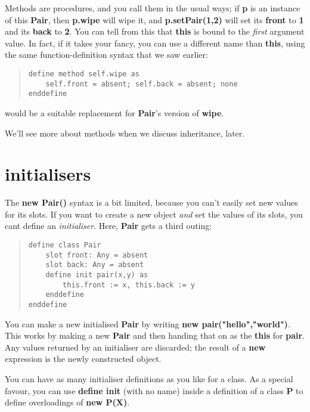\documentclass{report}
\begin{document}
Methods are procedures, and you call them in the usual ways; if {\bf p} is an
instance of this {\bf Pair}, then {\bf p.wipe} will wipe it, and {\bf p.setPair(1,2)} will
set its {\bf front} to {\bf 1} and its {\bf back} to {\bf 2}. You can tell from this that
{\bf this} is bound to the {\em first} argument value. In fact, if it takes your
fancy, you can use a different name than {\bf this}, using the same
function-definition syntax that we saw earlier:

\begin{quote}
\begin{verbatim}
define method self.wipe as
    self.front = absent; self.back = absent; none
enddefine
\end{verbatim}
\end{quote}


would be a suitable replacement for {\bf Pair}'s version of {\bf wipe}.

We'll see more about methods when we discuss inheritance, later.

\section{initialisers}


The {\bf new Pair()} syntax is a bit limited, because you can't easily set new
values for its slots. If you want to create a new object {\em and} set the
values of its slots, you cant define an {\em initialiser}. Here, {\bf Pair} gets a
third outing:

\begin{quote}
\begin{verbatim}
define class Pair
    slot front: Any = absent
    slot back: Any = absent
    define init pair(x,y) as
        this.front := x, this.back := y
    enddefine
enddefine
\end{verbatim}
\end{quote}


You can make a new initialised {\bf Pair} by writing {\bf new pair("hello","world")}.
This works by making a new {\bf Pair} and then handing that on as the {\bf this} for
{\bf pair}. Any values returned by an initialiser are discarded; the result of a
{\bf new} expression is the newly constructed object.

You can have as many initialiser definitions as you like for a class. As a
special favour, you can use {\bf define init} (with no name) inside a definition
of a class {\bf P} to define overloadings of {\bf new P(X)}.
\end{document}

